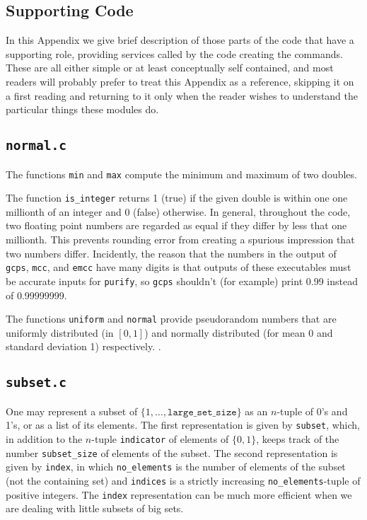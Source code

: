 \documentclass[12pt]{article}
\theoremstyle{definition}
\begin{document}
\begin{appendix}
\section{Supporting Code}

In this Appendix we give brief description of those parts of the code
that have a supporting role, providing services called by the code
creating the commands.  These are all either simple or at least
conceptually self contained, and most readers will probably prefer to
treat this Appendix as a reference, skipping it on a first reading and
returning to it only when the reader wishes to understand the
particular things these modules do.

\subsection{\texttt{normal.c}}

The functions \texttt{min} and \texttt{max} compute the minimum and
maximum of two doubles.

The function \texttt{is\_integer} returns 1 (true) if the given double
is within one one millionth of an integer and 0 (false) otherwise.  In
general, throughout the code, two floating point numbers are regarded
as equal if they differ by less that one millionth.  This prevents
rounding error from creating a spurious impression that two numbers
differ.  Incidently, the reason that the numbers in the output of
\texttt{gcps}, \texttt{mcc}, and \texttt{emcc} have many digits is
that outputs of these executables must be accurate inputs for
\texttt{purify}, so \texttt{gcps} shouldn't (for example) print 0.99
instead of 0.99999999.

The functions \texttt{uniform} and \texttt{normal} provide
pseudorandom numbers that are uniformly distributed (in $[0,1]$) and
normally distributed (for mean 0 and standard deviation 1)
respectively.  .

\subsection{\texttt{subset.c}}

One may represent a subset of $\{1, \ldots,
\mathtt{large\_set\_size}\}$ as an $n$-tuple of 0's and 1's, or as a
list of its elements.  The first representation is given by
\texttt{subset}, which, in addition to the $n$-tuple
\texttt{indicator} of elements of $\{0,1\}$, keeps track of the number
\texttt{subset\_size} of elements of the subset.  The second
representation is given by \texttt{index}, in which
\texttt{no\_elements} is the number of elements of the subset (not the
containing set) and \texttt{indices} is a strictly increasing
\texttt{no\_elements}-tuple of positive integers.  The \texttt{index}
representation can be much more efficient when we are dealing with
little subsets of big sets.


\end{appendix}
\end{document}
